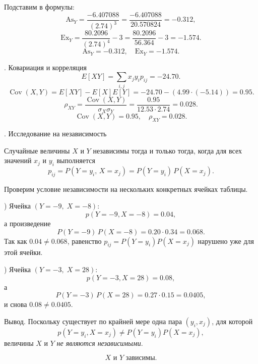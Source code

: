 \documentclass[a4paper,14pt]{extarticle}
\begin{document}
        Подставим в формулы:
        \[
        \mathrm{As}_Y = \frac{-6.407088}{(2.74)^3} = \frac{-6.407088}{20.570824} = -0.312,
        \]
        \[
        \mathrm{Ex}_Y = \frac{ 80.2096}{(2.74)^4} - 3 = \frac{ 80.2096}{56.364} - 3 = -1.574.
        \]
        \[
        \boxed{\mathrm{As}_Y = -0.312, \quad \mathrm{Ex}_Y = -1.574.}
        \]

        . Ковариация и корреляция
        \[
        E[XY] = \sum_{i,j} x_j y_i p_{ij} = -24.70.
        \]
        \[
        \operatorname{Cov}(X,Y) = E[XY] - E[X]E[Y] = -24.70 - (4.99 \cdot (-5.14)) = 0.95.
        \]
        \[
        \rho_{XY} = \frac{\operatorname{Cov}(X,Y)}{\sigma_X \sigma_Y} = \frac{0.95}{12.53 \cdot 2.74} = 0.028.
        \]
        \[
        \boxed{\operatorname{Cov}(X,Y) = 0.95, \quad \rho_{XY} = 0.028.}
        \]

        . Исследование на независимость

        Случайные величины $X$ и $Y$ независимы тогда и только тогда, когда для всех значений $x_j$ и $y_i$ выполняется
        \[
        p_{ij}=P(Y=y_i,\,X=x_j)=P(Y=y_i)\,P(X=x_j).
        \]

        Проверим условие независимости на нескольких конкретных ячейках таблицы.

        ) Ячейка $(Y=-9,\;X=-8)$:
        \[
        p(Y=-9,X=-8)=0.04,
        \]
        а произведение
        \[
        P(Y=-9)\,P(X=-8)=0.20\cdot0.34=0.068.
        \]
        Так как \(0.04 \neq 0.068\), равенство \(p_{ij}=P(Y=y_i)P(X=x_j)\) нарушено уже для этой ячейки.

        ) Ячейка $(Y=-3,\;X=28)$:
        \[
        p(Y=-3,X=28)=0.08,
        \]
        а
        \[
        P(Y=-3)\,P(X=28)=0.27\cdot0.15=0.0405,
        \]
        и снова \(0.08 \neq 0.0405\).

        \noindent Вывод. Поскольку существует по крайней мере одна пара \((y_i,x_j)\), для которой
        \[
        p(Y=y_i,X=x_j)\neq P(Y=y_i)P(X=x_j),
        \]
        величины $X$ и $Y$ \emph{не являются независимыми}.

        \[
        \boxed{\text{$X$ и $Y$ зависимы.}}
        \]
        

            
\end{document}
